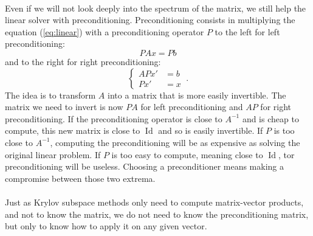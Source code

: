       \paragraph{}
      Even if we will not look deeply into the spectrum of the matrix, we still help the linear solver with preconditioning.
      Preconditioning consists in multiplying the equation (\ref{eq:linear}) with a preconditioning operator $P$ to the left for left preconditioning:
      \begin{equation}
        PAx = Pb
      \end{equation}
      and to the right for right preconditioning:
      \begin{equation}
        \left\{\begin{aligned} APx' &= b \\	Px' &= x \end{aligned}\right. \ .
      \end{equation}
      The idea is to transform $A$ into a matrix that is more easily invertible.
      The matrix we need to invert is now $PA$ for left preconditioning and $AP$ for right preconditioning.
      If the preconditioning operator is close to $A^{-1}$ and is cheap to compute, this new matrix is close to $\operatorname{Id}$ and so is easily invertible.
      If $P$ is too close to $A^{-1}$, computing the preconditioning will be as expensive as solving the original linear problem.
      If $P$ is too easy to compute, meaning close to $\operatorname{Id}$, tor preconditioning will be useless.
      Choosing a preconditioner means making a compromise between those two extrema.

      \paragraph{}
      Just as Krylov subspace methods only need to compute matrix-vector products, and not to know the matrix, we do not need to know the preconditioning matrix, but only to know how to apply it on any given vector.

